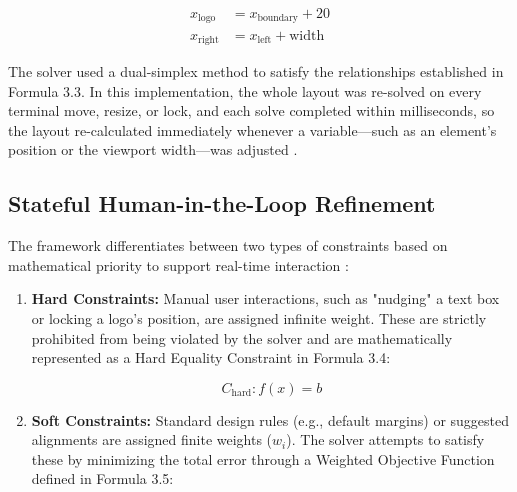 \begin{refsection}
\begin{center}
\begin{minipage}{0.8\textwidth}
\begin{equation}
\begin{aligned}
x_{\text{logo}} &= x_{\text{boundary}} + 20 \\
x_{\text{right}} &= x_{\text{left}} + \text{width}
\end{aligned}
\end{equation}
\centering
\end{minipage}
\end{center}

The solver used a dual-simplex method to satisfy the relationships established in Formula 3.3. In this implementation, the whole layout was re-solved on every terminal move, resize, or lock, and each solve completed within milliseconds, so the layout re-calculated immediately whenever a variable—such as an element's position or the viewport width—was adjusted \cite{Li2024SMT}.

\subsection{Stateful Human-in-the-Loop Refinement}
The framework differentiates between two types of constraints based on mathematical priority to support real-time interaction \cite{Li2024SMT}:

\begin{enumerate}
    \item \textbf{Hard Constraints:} Manual user interactions, such as "nudging" a text box or locking a logo's position, are assigned infinite weight. These are strictly prohibited from being violated by the solver and are mathematically represented as a Hard Equality Constraint in Formula 3.4:

    \begin{center}
    \begin{minipage}{0.8\textwidth}
    \begin{equation}
    C_{\text{hard}} : f(x) = b
    \end{equation}
    \centering
    \end{minipage}
    \end{center}
	
	\item \textbf{Soft Constraints:} Standard design rules (e.g., default margins) or suggested alignments are assigned finite weights ($w_i$). The solver attempts to satisfy these by minimizing the total error through a Weighted Objective Function defined in Formula 3.5:


\end{enumerate}
\end{refsection}
